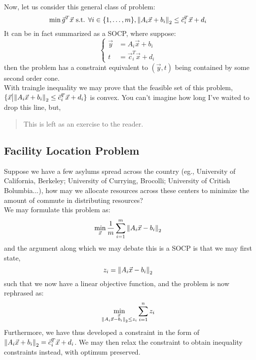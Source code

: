 Now, let us consider this general class of problem:
\[
    \min \vec{g}^T \vec{x} \text{ s.t. } \forall i \in \{1, \dots, m\}, {\| A_i \vec{x} + b_i \|}_{2}^{} \leq \vec{c}_i^T \vec{x} + d_i
\]
It can be in fact summarized as a SOCP, where suppose:
\[
    \begin{cases}
        \vec{y} &= A_i \vec{x} + b_i \\
        t &= \vec{c}_i^T \vec{x} + d_i
    \end{cases}
\]
then the problem has a constraint equivalent to $(\vec{y}, t)$ being contained by some second order cone. \\
With traingle inequality we may prove that the feasible set of this problem, $\{\vec{x} \big| {\| A_i \vec{x} + b_i \|}_{2}^{} \leq \vec{c}_i^T \vec{x} + d_i \}$ is convex.
You can't imagine how long I've waited to drop this line, but,
\begin{quote}
    This is left as an exercise to the reader.
\end{quote}

\subsection{Facility Location Problem}
Suppose we have a few asylums spread across the country (eg., University of California, Berkeley; University of Currying, Brocolli; University of Critish Bolumbia...), how may we allocate resources across these centers to minimize the amount of commute in distributing resources? \\
We may formulate this problem as:
\[
    \min_{\vec{x}} \frac{1}{m} \sum_{i = 1}^m {\| A_i \vec{x} - b_i \|}_{2}^{}
\]
and the argument along which we may debate this is a SOCP is that we may first state,
\[
    z_i = {\| A_i \vec{x} - b_i \|}_{2}^{}
\]
such that we now have a linear objective function, and the problem is now rephrased as:
\[
    \min_{
        \substack{
            x \\
            {\| A_i \vec{x} - b_i \|}_{2}^{} \leq z_i
        }
    } \sum_{i = 1}^n z_i
\]
Furthermore, we have thus developed a constraint in the form of ${\| A_i \vec{x} + b_i \|}_{2}^{} = \vec{c}_i^T \vec{x} + d_i$.
We may then relax the constraint to obtain inequality constraints instead, with optimum preserved.

